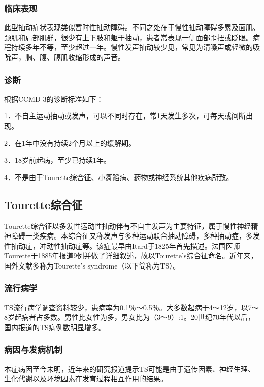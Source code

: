 \subsubsection{临床表现}

此型抽动症状表现类似暂时性抽动障碍。不同之处在于慢性抽动障碍多累及面肌、颈肌和肩部肌群，很少有上下肢和躯干抽动，患者常表现一侧面部歪扭或眨眼。病程持续多年不等，至少超过一年。慢性发声抽动较少见，常见为清嗓声或轻微的吸吮声，胸、腹、膈肌收缩形成的声音。

\subsubsection{诊断}

根据CCMD-3的诊断标准如下：

1．不自主运动抽动或发声，可以不同时存在，常1天发生多次，可每天或间断出现。

2．在1年中没有持续2个月以上的缓解期。

3．18岁前起病，至少已持续1年。

4．不是由于Tourette综合征、小舞蹈病、药物或神经系统其他疾病所致。

\subsection{Tourette综合征}

Tourette综合征以多发性运动性抽动伴有不自主发声为主要特征，属于慢性神经精神障碍一类疾病。本综合征又称发声与多种运动联合抽动障碍，多种抽动症，多发性抽动症，冲动性抽动症等。该症最早由Itard于1825年首先描述。法国医师Tourette于1885年报道9例并做了详细叙述，故以Tourette's综合征命名。近年来，国外文献多称为Tourette's
syndrome（以下简称为TS）。

\subsubsection{流行病学}

TS流行病学调查资料较少，患病率为0.1％～0.5％。大多数起病于4～12岁，以7～8岁起病者占多数。男性比女性为多，男女比为（3～9）:1。20世纪70年代以后，国内报道的TS病例数明显增多。

\subsubsection{病因与发病机制}

本症病因至今未明，近年来的研究报道提示TS可能是由于遗传因素、神经生理、生化代谢以及环境因素在发育过程相互作用的结果。

